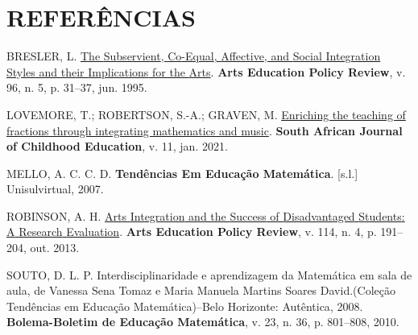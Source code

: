 \documentclass[
  letterpaper,
  DIV=11,
  numbers=noendperiod]{scrreprt}
\newlength{\cslhangindent}
\newenvironment{CSLReferences}[2] %
 {\begin{list}{}{%
  \setlength{\itemindent}{0pt}
  \setlength{\leftmargin}{0pt}
  \setlength{\parsep}{0pt}
  \ifodd #1
   \setlength{\leftmargin}{\cslhangindent}
   \setlength{\itemindent}{-1\cslhangindent}
  \fi
  \setlength{\itemsep}{#2\baselineskip}}}
 {\end{list}}
\begin{document}
\chapter*{REFERÊNCIAS}\label{referuxeancias}

\label{refs}
\begin{CSLReferences}{0}{1}
BRESLER, L. \href{https://doi.org/10.1080/10632913.1995.9934564}{The
{Subservient}, {Co}-{Equal}, {Affective}, and {Social} {Integration}
{Styles} and their {Implications} for the {Arts}}. \textbf{Arts
Education Policy Review}, v. 96, n. 5, p. 31--37, jun. 1995.

LOVEMORE, T.; ROBERTSON, S.-A.; GRAVEN, M.
\href{https://doi.org/10.4102/sajce.v11i1.899}{Enriching the teaching of
fractions through integrating mathematics and music}. \textbf{South
African Journal of Childhood Education}, v. 11, jan. 2021.

MELLO, A. C. C. D. \textbf{Tendências {Em} {Educação} {Matemática}}.
{[}s.l.{]} Unisulvirtual, 2007.

ROBINSON, A. H. \href{https://doi.org/10.1080/10632913.2013.826050}{Arts
{Integration} and the {Success} of {Disadvantaged} {Students}: {A}
{Research} {Evaluation}}. \textbf{Arts Education Policy Review}, v. 114,
n. 4, p. 191--204, out. 2013.

SOUTO, D. L. P. Interdisciplinaridade e aprendizagem da {Matemática} em
sala de aula, de {Vanessa} {Sena} {Tomaz} e {Maria} {Manuela} {Martins}
{Soares} {David}.({Coleção} {Tendências} em {Educação}
{Matemática})--{Belo} {Horizonte}: {Autêntica}, 2008.
\textbf{Bolema-Boletim de Educação Matemática}, v. 23, n. 36, p.
801--808, 2010.

\end{CSLReferences}
\end{document}
